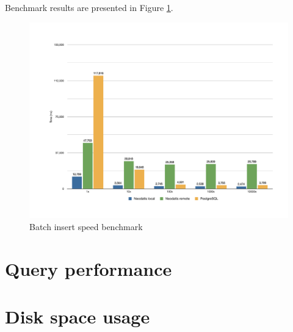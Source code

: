 \documentclass[a4paper,titlepage,12pt]{article}
\begin{document}
Benchmark results are presented in Figure \ref{fig:batch_insert}.


\begin{landscape}
    \begin{figure}[p]
        \includegraphics[scale=0.6]{Fig1.pdf}
        \caption{Batch insert speed benchmark}
        \label{fig:batch_insert}
    \end{figure}
\end{landscape}

\section{Query performance}\label{sec:query_performance}

\section{Disk space usage}\label{sec:disk_space_usage}
\end{document}
